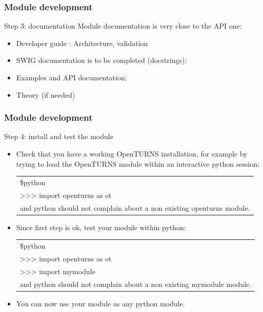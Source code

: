 \documentclass[8pt]{beamer}
\begin{document}
\begin{frame}
  \frametitle{Module development}
  \begin{block}{Step 3: documentation}
    Module documentation is very close to the API one:
    \begin{itemize}
    \item Developer guide : Architecture, validation
    \item SWIG documentation is to be completed (docstrings); 
    \item Examples and API documentation;
    \item Theory (if needed)
    \end{itemize}
  \end{block}
\end{frame}


\begin{frame}
  \frametitle{Module development}
  \begin{block}{Step 4: install and test the module}
    \begin{itemize}
    \item Check that you have a working OpenTURNS installation, for example by trying to load the OpenTURNS module within an interactive python session:
      \begin{tabular}{l}
        \ttfamily \$python\\
        \ttfamily >>> import openturns as ot\\
      and python should not complain about a non existing openturns module.\\
      \end{tabular}
    \item Since first step is ok, test your module within python:\\
      \begin{tabular}{l}
        \ttfamily \$python \\
        \ttfamily >>> import openturns as ot \\
        \ttfamily >>> import mymodule \\
      and python should not complain about a non existing mymodule module.
      \end{tabular}
      \item You can now use your module as any python module.
    \end{itemize}
  \end{block}
\end{frame}
\end{document}
